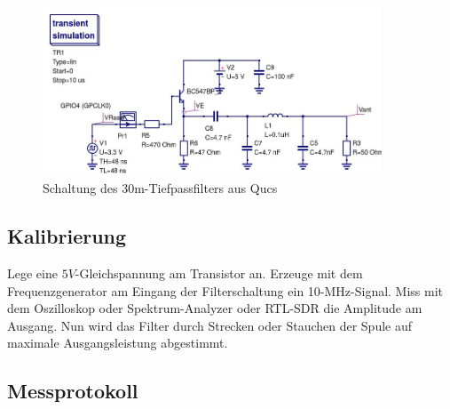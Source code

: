 
\begin{figure}[H]
    \centering
    \includegraphics[width=0.9\textwidth]{Messtechnik/Bilder/30mRaspiAmpLP.jpg}
    \caption{Schaltung des 30m-Tiefpassfilters aus Qucs}
    \label{fig:30mLP}
\end{figure}

\subsection*{Kalibrierung}

Lege eine $5V$-Gleichspannung am Transistor an. Erzeuge mit dem
Frequenzgenerator am Eingang der Filterschaltung ein 10-MHz-Signal. Miss mit dem
Oszilloskop oder Spektrum-Analyzer oder RTL-SDR die Amplitude am Ausgang. Nun
wird das Filter durch Strecken oder Stauchen der Spule auf maximale
Ausgangsleistung abgestimmt.

\subsection*{Messprotokoll}


